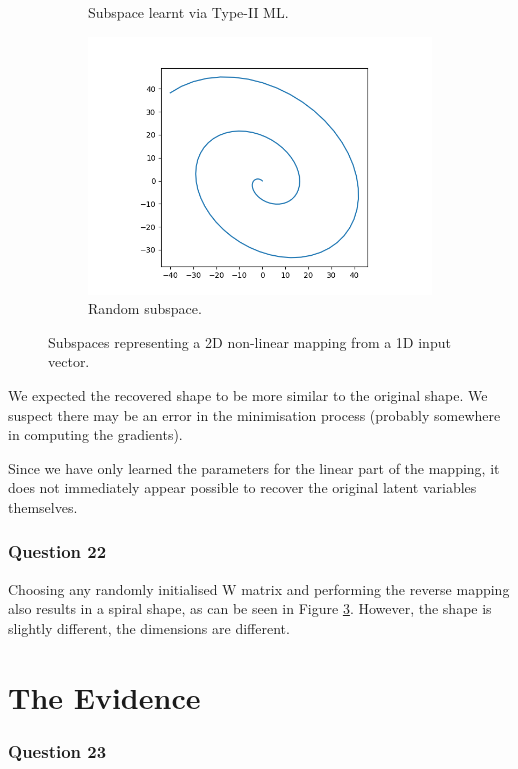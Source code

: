\documentclass[10pt, a4paper, twocolumn]{article} %
\begin{document}
\begin{figure}[!htb]
\begin{subfigure}{.5\linewidth}
  \caption{Subspace learnt via Type-II ML.}
  \label{fig:q21b}
\end{subfigure}
\begin{subfigure}{.5\linewidth}
  \centering
  \includegraphics[width=.9\linewidth]{q22.png}
  \caption{Random subspace.}
  \label{fig:q22}
\end{subfigure}
\caption{Subspaces representing a 2D non-linear mapping from a 1D input vector. }
\end{figure}

We expected the recovered shape to be more similar to the original shape. We suspect there may be an error in the minimisation process (probably somewhere in computing the gradients).

Since we have only learned the parameters for the linear part of the mapping, it does not immediately appear possible to recover the original latent variables themselves.

\subsubsection*{Question 22}

Choosing any randomly initialised W matrix and performing the reverse mapping also results in a spiral shape, as can be seen in Figure \ref{fig:q22}. However, the shape is slightly different, the dimensions are different.


\section{The Evidence}

\subsubsection*{Question 23}
\end{document}
